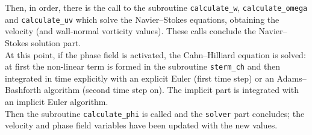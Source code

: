 Then, in order, there is the call to the subroutine \texttt{calculate\_w}, \texttt{calculate\_omega} and \texttt{calculate\_uv} which solve the Navier--Stokes equations, obtaining the velocity (and wall-normal vorticity values). These calls conclude the Navier--Stokes solution part.\\
At this point, if the phase field is activated, the Cahn--Hilliard equation is solved: at first the non-linear term is formed in the subroutine \texttt{sterm\_ch} and then integrated in time explicitly with an explicit Euler (first time step) or an Adams--Bashforth algorithm (second time step on). The implicit part is integrated with an implicit Euler algorithm.\\
Then the subroutine \texttt{calculate\_phi} is called and the \texttt{solver} part concludes; the velocity and phase field variables have been updated with the new values.
\def\arraystretch{0.4}
